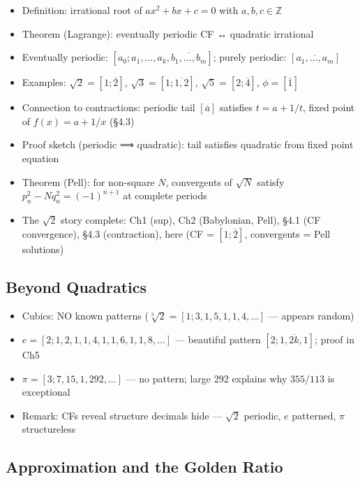 \documentclass[
  10pt,
  letterpaper,
]{scrbook}
\providecommand{\tightlist}{%
  \setlength{\itemsep}{0pt}\setlength{\parskip}{0pt}}
\newcommand{\ZZ}{\mathbb{Z}}
\begin{document}
\begin{itemize}
\tightlist
\item
  Definition: irrational root of \(ax^2 + bx + c = 0\) with
  \(a, b, c \in \ZZ\)
\item
  Theorem (Lagrange): eventually periodic CF ↔ quadratic irrational
\item
  Eventually periodic:
  \([a_0; a_1, \ldots, a_k, \overline{b_1, \ldots, b_m}]\); purely
  periodic: \([\overline{a_1, \ldots, a_m}]\)
\item
  Examples: \(\sqrt{2} = [1; \overline{2}]\),
  \(\sqrt{3} = [1; \overline{1, 2}]\), \(\sqrt{5} = [2; \overline{4}]\),
  \(\phi = [\overline{1}]\)
\item
  Connection to contractions: periodic tail \([\overline{a}]\) satisfies
  \(t = a + 1/t\), fixed point of \(f(x) = a + 1/x\) (§4.3)
\item
  Proof sketch (periodic ⟹ quadratic): tail satisfies quadratic from
  fixed point equation
\item
  Theorem (Pell): for non-square \(N\), convergents of \(\sqrt{N}\)
  satisfy \(p_n^2 - Nq_n^2 = (-1)^{n+1}\) at complete periods
\item
  The \(\sqrt{2}\) story complete: Ch1 (sup), Ch2 (Babylonian, Pell),
  §4.1 (CF convergence), §4.3 (contraction), here (CF =
  \([1; \overline{2}]\), convergents = Pell solutions)
\end{itemize}

\subsection{Beyond Quadratics}\label{beyond-quadratics}

\begin{itemize}
\tightlist
\item
  Cubics: NO known patterns
  (\(\sqrt[3]{2} = [1; 3, 1, 5, 1, 1, 4, ...]\) --- appears random)
\item
  \(e = [2; 1, 2, 1, 1, 4, 1, 1, 6, 1, 1, 8, \ldots]\) --- beautiful
  pattern \([2; \overline{1, 2k, 1}]\); proof in Ch5
\item
  \(\pi = [3; 7, 15, 1, 292, ...]\) --- no pattern; large 292 explains
  why \(355/113\) is exceptional
\item
  Remark: CFs reveal structure decimals hide --- \(\sqrt{2}\) periodic,
  \(e\) patterned, \(\pi\) structureless
\end{itemize}

\subsection{Approximation and the Golden
Ratio}\label{approximation-and-the-golden-ratio}
\end{document}
